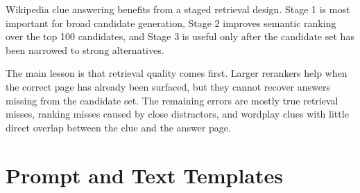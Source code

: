 \documentclass[11pt]{article}
\begin{document}
Wikipedia clue answering benefits from a staged retrieval design. Stage 1 is most important for broad candidate generation, Stage 2 improves semantic ranking over the top 100 candidates, and Stage 3 is useful only after the candidate set has been narrowed to strong alternatives.

The main lesson is that retrieval quality comes first. Larger rerankers help when the correct page has already been surfaced, but they cannot recover answers missing from the candidate set. The remaining errors are mostly true retrieval misses, ranking misses caused by close distractors, and wordplay clues with little direct overlap between the clue and the answer page.





\appendix

\section{Prompt and Text Templates}
\end{document}
